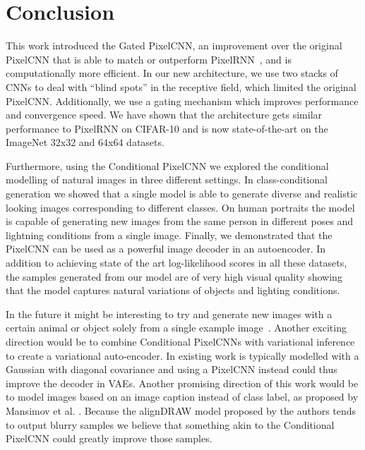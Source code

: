\documentclass{article}
\begin{document}
 \section{Conclusion}


This work introduced the Gated PixelCNN, an improvement over the original PixelCNN that is able to match or outperform PixelRNN~\cite{van2016pixel}, and is computationally more efficient. In our new architecture, we use two stacks of CNNs to deal with ``blind spots'' in the receptive field, which limited the original PixelCNN. Additionally, we use a gating mechanism which improves performance and convergence speed. We have shown that the architecture gets similar performance to PixelRNN on CIFAR-10 and is now state-of-the-art on the ImageNet 32x32 and 64x64 datasets.

Furthermore, using the Conditional PixelCNN we explored the conditional modelling of natural images in three different settings. In class-conditional generation we showed that a single model is able to generate diverse and realistic looking images corresponding to different classes. On human portraits the model is capable of generating new images from the same person in different poses and lightning conditions from a single image. Finally, we demonstrated that the PixelCNN can be used as a powerful image decoder in an autoencoder. In addition to achieving state of the art log-likelihood scores in all these datasets, the samples generated from our model are of very high visual quality showing that the model captures natural variations of objects and lighting conditions.
 
In the future it might be interesting to try and generate new images with a certain animal or object solely from a single example image~\cite{rezende2016one,salakhutdinov2013learning}. Another exciting direction would be to combine Conditional PixelCNNs with variational inference to create a variational auto-encoder. In existing work  is typically modelled with a Gaussian with diagonal covariance and using a PixelCNN instead could thus improve the decoder in VAEs. Another promising direction of this work would be to model images based on an image caption instead of class label, as proposed by Mansimov et al. \cite{mansimov2015generating}. Because the alignDRAW model proposed by the authors tends to output blurry samples we believe that something akin to the Conditional PixelCNN could greatly improve those samples. 
\small{
  
  
}
\end{document}
